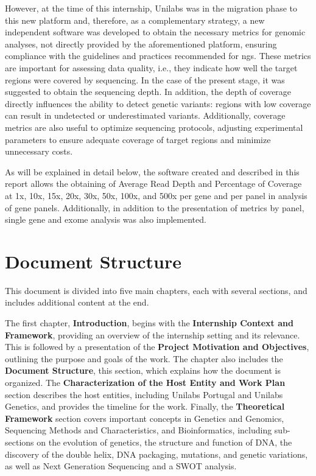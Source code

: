 However, at the time of this internship, Unilabs was in the migration phase to this new platform and, therefore, as a complementary strategy, a new independent software was developed to obtain the necessary metrics for genomic analyses, not directly provided by the aforementioned platform, ensuring compliance with the guidelines and practices recommended for \ac{ngs}. These metrics are important for assessing data quality, i.e., they indicate how well the target regions were covered by sequencing. In the case of the present stage, it was suggested to obtain the sequencing depth. In addition, the depth of coverage directly influences the ability to detect genetic variants: regions with low coverage can result in undetected or underestimated variants. Additionally, coverage metrics are also useful to optimize sequencing protocols, adjusting experimental parameters to ensure adequate coverage of target regions and minimize unnecessary costs. 

As will be explained in detail below, the software created and described in this report allows the obtaining of Average Read Depth and Percentage of Coverage at 1x, 10x, 15x, 20x, 30x, 50x, 100x, and 500x per gene and per panel in analysis of gene panels. Additionally, in addition to the presentation of metrics by panel, single gene and exome analysis was also implemented.

\section{Document Structure} \label{sec:doc_structure}
This document is divided into five main chapters, each with several sections, and includes additional content at the end.

The first chapter, \textbf{Introduction}, begins with the \textbf{Internship Context and Framework}, providing an overview of the internship setting and its relevance. This is followed by a presentation of the \textbf{Project Motivation and Objectives}, outlining the purpose and goals of the work. The chapter also includes the \textbf{Document Structure}, this section, which explains how the document is organized. The \textbf{Characterization of the Host Entity and Work Plan} section describes the host entities, including Unilabs Portugal and Unilabs Genetics, and provides the timeline for the work. Finally, the \textbf{Theoretical Framework} section covers important concepts in Genetics and Genomics, Sequencing Methods and Characteristics, and Bioinformatics, including sub-sections on the evolution of genetics, the structure and function of DNA, the discovery of the double helix, DNA packaging, mutations, and genetic variations, as well as Next Generation Sequencing and a SWOT analysis.

